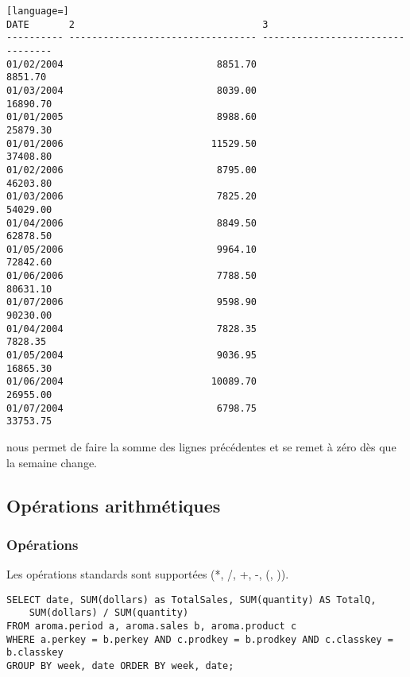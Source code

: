 \begin{lstlisting}[language=]
DATE       2                                 3                                
---------- --------------------------------- ---------------------------------
01/02/2004                           8851.70                           8851.70
01/03/2004                           8039.00                          16890.70
01/01/2005                           8988.60                          25879.30
01/01/2006                          11529.50                          37408.80
01/02/2006                           8795.00                          46203.80
01/03/2006                           7825.20                          54029.00
01/04/2006                           8849.50                          62878.50
01/05/2006                           9964.10                          72842.60
01/06/2006                           7788.50                          80631.10
01/07/2006                           9598.90                          90230.00
01/04/2004                           7828.35                           7828.35
01/05/2004                           9036.95                          16865.30
01/06/2004                          10089.70                          26955.00
01/07/2004                           6798.75                          33753.75
\end{lstlisting}

 nous permet de faire la somme des lignes précédentes et se remet à zéro dès que la semaine change.

\subsection{Opérations arithmétiques}
\subsubsection{Opérations}
Les opérations standards sont supportées (*, /, +, -, (, )).

\begin{lstlisting}[title=Prix moyen de chaque produit par vente]
SELECT date, SUM(dollars) as TotalSales, SUM(quantity) AS TotalQ,
    SUM(dollars) / SUM(quantity)
FROM aroma.period a, aroma.sales b, aroma.product c 
WHERE a.perkey = b.perkey AND c.prodkey = b.prodkey AND c.classkey = b.classkey 
GROUP BY week, date ORDER BY week, date;
\end{lstlisting}

